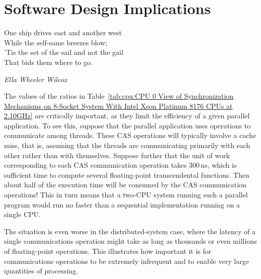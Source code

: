 
\section{Software Design Implications}
\label{sec:cpu:Software Design Implications}
%
\epigraph{One ship drives east and another west \\
	  While the self-same breezes blow; \\
	  'Tis the set of the sail and not the gail \\
	  That bids them where to go.}
	 {\emph{Ella Wheeler Wilcox}}

The values of the ratios in
Table~\ref{tab:cpu:CPU 0 View of Synchronization Mechanisms on 8-Socket System With Intel Xeon Platinum 8176 CPUs at 2.10GHz}
are critically important, as they limit the
efficiency of a given parallel application.
To see this, suppose that the parallel application uses 
operations to communicate among threads.
These CAS operations will typically involve a cache miss, that is, assuming
that the threads are communicating primarily with each other rather than
with themselves.
Suppose further that the unit of work corresponding to each CAS communication
operation takes 300\,ns, which is sufficient time to compute several
floating-point transcendental functions.
Then about half of the execution time will be consumed by the CAS
communication operations!
This in turn means that a two-CPU system running such a parallel program
would run no faster than a sequential implementation running on a
single CPU\@.

The situation is even worse in the distributed-system case, where the
latency of a single communications operation might take as long as
thousands or even millions of floating-point operations.
This illustrates how important it is for communications operations to
be extremely infrequent and to enable very large quantities of processing.

